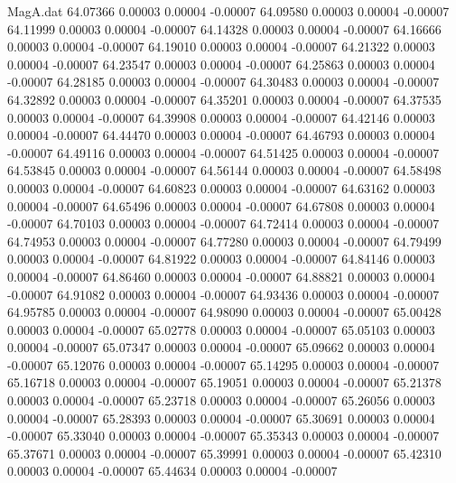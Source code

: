 \begin{filecontents}{MagA.dat}
  64.07366    0.00003    0.00004   -0.00007
  64.09580    0.00003    0.00004   -0.00007
  64.11999    0.00003    0.00004   -0.00007
  64.14328    0.00003    0.00004   -0.00007
  64.16666    0.00003    0.00004   -0.00007
  64.19010    0.00003    0.00004   -0.00007
  64.21322    0.00003    0.00004   -0.00007
  64.23547    0.00003    0.00004   -0.00007
  64.25863    0.00003    0.00004   -0.00007
  64.28185    0.00003    0.00004   -0.00007
  64.30483    0.00003    0.00004   -0.00007
  64.32892    0.00003    0.00004   -0.00007
  64.35201    0.00003    0.00004   -0.00007
  64.37535    0.00003    0.00004   -0.00007
  64.39908    0.00003    0.00004   -0.00007
  64.42146    0.00003    0.00004   -0.00007
  64.44470    0.00003    0.00004   -0.00007
  64.46793    0.00003    0.00004   -0.00007
  64.49116    0.00003    0.00004   -0.00007
  64.51425    0.00003    0.00004   -0.00007
  64.53845    0.00003    0.00004   -0.00007
  64.56144    0.00003    0.00004   -0.00007
  64.58498    0.00003    0.00004   -0.00007
  64.60823    0.00003    0.00004   -0.00007
  64.63162    0.00003    0.00004   -0.00007
  64.65496    0.00003    0.00004   -0.00007
  64.67808    0.00003    0.00004   -0.00007
  64.70103    0.00003    0.00004   -0.00007
  64.72414    0.00003    0.00004   -0.00007
  64.74953    0.00003    0.00004   -0.00007
  64.77280    0.00003    0.00004   -0.00007
  64.79499    0.00003    0.00004   -0.00007
  64.81922    0.00003    0.00004   -0.00007
  64.84146    0.00003    0.00004   -0.00007
  64.86460    0.00003    0.00004   -0.00007
  64.88821    0.00003    0.00004   -0.00007
  64.91082    0.00003    0.00004   -0.00007
  64.93436    0.00003    0.00004   -0.00007
  64.95785    0.00003    0.00004   -0.00007
  64.98090    0.00003    0.00004   -0.00007
  65.00428    0.00003    0.00004   -0.00007
  65.02778    0.00003    0.00004   -0.00007
  65.05103    0.00003    0.00004   -0.00007
  65.07347    0.00003    0.00004   -0.00007
  65.09662    0.00003    0.00004   -0.00007
  65.12076    0.00003    0.00004   -0.00007
  65.14295    0.00003    0.00004   -0.00007
  65.16718    0.00003    0.00004   -0.00007
  65.19051    0.00003    0.00004   -0.00007
  65.21378    0.00003    0.00004   -0.00007
  65.23718    0.00003    0.00004   -0.00007
  65.26056    0.00003    0.00004   -0.00007
  65.28393    0.00003    0.00004   -0.00007
  65.30691    0.00003    0.00004   -0.00007
  65.33040    0.00003    0.00004   -0.00007
  65.35343    0.00003    0.00004   -0.00007
  65.37671    0.00003    0.00004   -0.00007
  65.39991    0.00003    0.00004   -0.00007
  65.42310    0.00003    0.00004   -0.00007
  65.44634    0.00003    0.00004   -0.00007

\end{filecontents}
